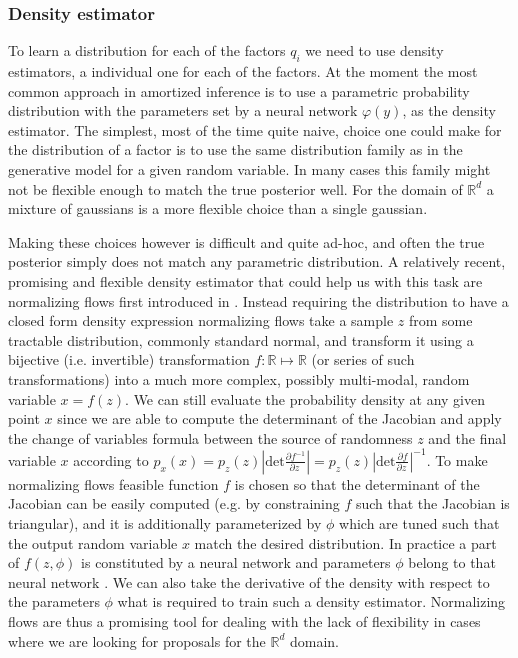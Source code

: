 \documentclass[12pt]{article}
\begin{document}




\subsubsection*{Density estimator}
To learn a distribution for each of the factors $q_i$ we need to use density estimators, a individual one for each of the factors.
At the moment the most common approach in amortized inference is to use a parametric probability distribution with the parameters set by a neural network $\varphi(y)$, as the density estimator.
The simplest, most of the time quite naive, choice one could make for the distribution of a factor is to use the same distribution family as in the generative model for a given random variable.
In many cases this family might not be flexible enough to match the true posterior well.
For the domain of $\mathbb{R}^d$ a mixture of gaussians is a more flexible choice than a single gaussian.

Making these choices however is difficult and quite ad-hoc, and often the true posterior simply does not match any parametric distribution.
A relatively recent, promising and flexible density estimator that could help us with this task are normalizing flows first introduced in \citet{RezendeMohamed2015}.
Instead requiring the distribution to have a closed form density expression normalizing flows take a sample $z$ from some tractable distribution, commonly standard normal, and transform it using a bijective (i.e. invertible) transformation $f: \mathbb{R} \mapsto \mathbb{R}$ (or series of such transformations) into a much more complex, possibly multi-modal, random variable $x=f(z)$.
We can still evaluate the probability density at any given point $x$ since we are able to compute the determinant of the Jacobian and apply the change of variables formula between the source of randomness $z$ and the final variable $x$ according to 
$p_x(x) = p_z(z) \left|
    \mathrm{det} \frac{
      \partial f^{-1}
    }{
      \partial z\
    }
  \right|
  = p_z(z) \left|
    \mathrm{det} \frac{
      \partial f
    }{
      \partial z\
    }
  \right| ^{-1}$.
To make normalizing flows feasible function $f$ is chosen so that the determinant of the Jacobian can be easily computed (e.g. by constraining $f$ such that the Jacobian is triangular), and it is additionally parameterized by $\phi$ which are tuned such that the output random variable $x$ match the desired distribution. In practice a part of $f(z, \phi)$ is constituted by a  neural network and parameters $\phi$ belong to that neural network \citep{IAF,MAF}.
We can also take the derivative of the density with respect to the parameters $\phi$ what is required to train such a density estimator.
Normalizing flows are thus a promising tool for dealing with the lack of flexibility in cases where we are looking for proposals for the $\mathbb{R}^d$ domain.
\end{document}
